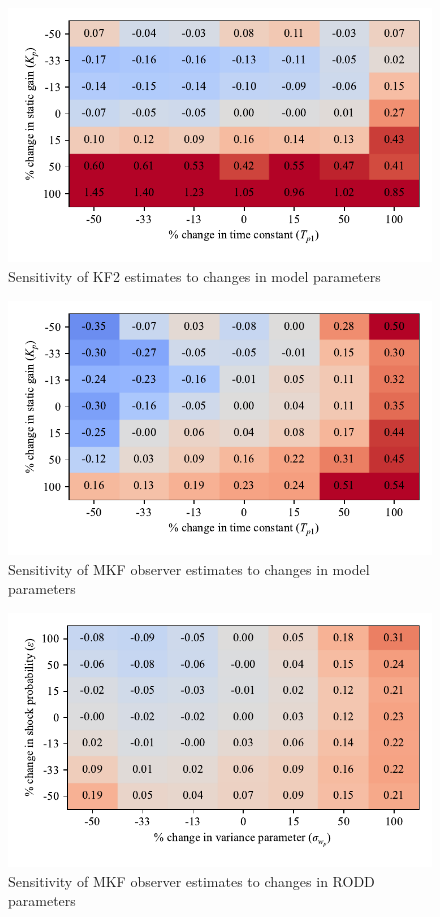 \begin{figure}[htp]
	\centering
	\includegraphics[width=12cm]{images/rod_obs_sim_sens_model_KF2_MSE_y_est.pdf}
	\caption{Sensitivity of KF2 estimates to changes in model parameters}
	\label{fig:rod_obs_sim_sens_model_KF2_MSE_y_est}
\end{figure}

\begin{figure}[htp]
	\centering
	\includegraphics[width=12cm]{images/rod_obs_sim_sens_model_MKF_MSE_y_est.pdf}
	\caption{Sensitivity of \gls{MKF} observer estimates to changes in model parameters}
	\label{fig:rod_obs_sim_sens_model_MKF_MSE_y_est}
\end{figure}

\begin{figure}[htp]
	\centering
	\includegraphics[width=12cm]{images/rod_obs_sim_sens_rod_MKF_MSE_y_est.pdf}
	\caption{Sensitivity of \gls{MKF} observer estimates to changes in \gls{RODD} parameters}
	\label{fig:rod_obs_sim_sens_rod_MKF_MSE_y_est}
\end{figure}


